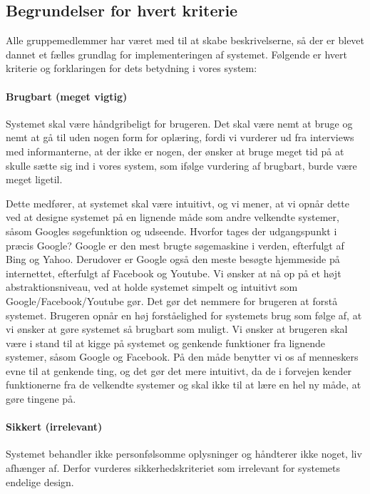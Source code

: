 \subsection{Begrundelser for hvert kriterie}
\label{sec:begrundelsekriterier}
Alle gruppemedlemmer har været med til at skabe beskrivelserne, så der er blevet dannet et fælles grundlag for implementeringen af systemet. Følgende er hvert kriterie og forklaringen for dets betydning i vores system:

\paragraph{Brugbart (meget vigtig)} 
Systemet skal være håndgribeligt for brugeren. Det skal være nemt at bruge og nemt at gå til uden nogen form for oplæring, fordi vi vurderer ud fra interviews med informanterne, at der ikke er nogen, der ønsker at bruge meget tid på at skulle sætte sig ind i vores system, som ifølge vurdering af brugbart, burde være meget ligetil. 

Dette medfører, at systemet skal være intuitivt, og vi mener, at vi opnår dette ved at designe systemet på en lignende måde som andre velkendte systemer, såsom Googles søgefunktion og udseende. Hvorfor tages der udgangspunkt i præcis Google? Google er den mest brugte søgemaskine i verden, efterfulgt af Bing og Yahoo.\cite{googlesoeg} \cite{ebizmba} Derudover er Google også den meste besøgte hjemmeside på internettet, efterfulgt af Facebook og Youtube. \cite{alexadk} Vi ønsker at nå op på et højt abstraktionsniveau, ved at holde systemet simpelt og intuitivt som Google/Facebook/Youtube gør. Det gør det nemmere for brugeren at forstå systemet. Brugeren opnår en høj forståelighed for systemets brug som følge af, at vi ønsker at gøre systemet så brugbart som muligt. Vi ønsker at brugeren skal være i stand til at kigge på systemet og genkende funktioner fra lignende systemer, såsom Google og Facebook. På den måde benytter vi os af menneskers evne til at genkende ting, og det gør det mere intuitivt, da de i forvejen kender funktionerne fra de velkendte systemer og skal ikke til at lære en hel ny måde, at gøre tingene på.

\paragraph{Sikkert (irrelevant)} 
Systemet behandler ikke personfølsomme oplysninger og håndterer ikke noget, liv afhænger af. Derfor vurderes sikkerhedskriteriet som irrelevant for systemets endelige design.

